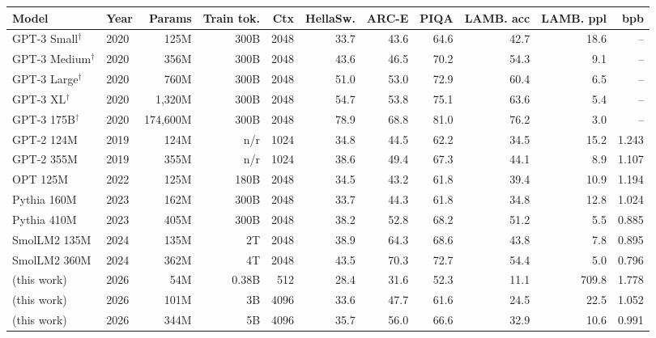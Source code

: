 \begin{tabular}{llrrrrrrrrr}
\toprule
Model & Year & Params & Train tok. & Ctx & HellaSw. & ARC-E & PIQA & LAMB. acc & LAMB. ppl & bpb \\
\midrule
GPT-3 Small$^\dagger$ & 2020 & 125M & 300B & 2048 & 33.7 & 43.6 & 64.6 & 42.7 & 18.6 & -- \\
GPT-3 Medium$^\dagger$ & 2020 & 356M & 300B & 2048 & 43.6 & 46.5 & 70.2 & 54.3 & 9.1 & -- \\
GPT-3 Large$^\dagger$ & 2020 & 760M & 300B & 2048 & 51.0 & 53.0 & 72.9 & 60.4 & 6.5 & -- \\
GPT-3 XL$^\dagger$ & 2020 & 1,320M & 300B & 2048 & 54.7 & 53.8 & 75.1 & 63.6 & 5.4 & -- \\
GPT-3 175B$^\dagger$ & 2020 & 174,600M & 300B & 2048 & 78.9 & 68.8 & 81.0 & 76.2 & 3.0 & -- \\
\midrule
GPT-2 124M & 2019 & 124M & n/r & 1024 & 34.8 & 44.5 & 62.2 & 34.5 & 15.2 & 1.243 \\
GPT-2 355M & 2019 & 355M & n/r & 1024 & 38.6 & 49.4 & 67.3 & 44.1 & 8.9 & 1.107 \\
OPT 125M & 2022 & 125M & 180B & 2048 & 34.5 & 43.2 & 61.8 & 39.4 & 10.9 & 1.194 \\
Pythia 160M & 2023 & 162M & 300B & 2048 & 33.7 & 44.3 & 61.8 & 34.8 & 12.8 & 1.024 \\
Pythia 410M & 2023 & 405M & 300B & 2048 & 38.2 & 52.8 & 68.2 & 51.2 & 5.5 & 0.885 \\
SmolLM2 135M & 2024 & 135M & 2T & 2048 & 38.9 & 64.3 & 68.6 & 43.8 & 7.8 & 0.895 \\
SmolLM2 360M & 2024 & 362M & 4T & 2048 & 43.5 & 70.3 & 72.7 & 54.4 & 5.0 & 0.796 \\
\midrule
\textbf{\A{}} (this work) & 2026 & 54M & 0.38B & 512 & 28.4 & 31.6 & 52.3 & 11.1 & 709.8 & 1.778 \\
\textbf{\B{}} (this work) & 2026 & 101M & 3B & 4096 & 33.6 & 47.7 & 61.6 & 24.5 & 22.5 & 1.052 \\
\textbf{\C{}} (this work) & 2026 & 344M & 5B & 4096 & 35.7 & 56.0 & 66.6 & 32.9 & 10.6 & 0.991 \\
\bottomrule
\end{tabular}
